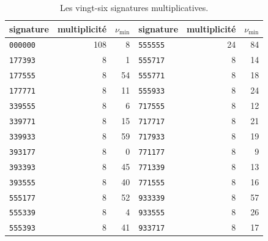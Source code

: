 \begin{minipage}{\linewidth}
\begin{table}[H]
\par\vspace{12pt}

\caption{Les vingt-six signatures multiplicatives.}
\label{act21:tpk:firmas-multiplicativas}
\begin{tabular}{@{}lrr@{\qquad}lrr@{}}
\toprule
signature&multiplicité&\(\nu_{\min}\)&signature&multiplicité&\(\nu_{\min}\)\\
\midrule
\texttt{000000}&108&8&\texttt{555555}&24&84\\
\texttt{177393}&8&1&\texttt{555717}&8&14\\
\texttt{177555}&8&54&\texttt{555771}&8&18\\
\texttt{177771}&8&11&\texttt{555933}&8&24\\
\texttt{339555}&8&6&\texttt{717555}&8&12\\
\texttt{339771}&8&15&\texttt{717717}&8&21\\
\texttt{339933}&8&59&\texttt{717933}&8&19\\
\texttt{393177}&8&0&\texttt{771177}&8&9\\
\texttt{393393}&8&45&\texttt{771339}&8&13\\
\texttt{393555}&8&40&\texttt{771555}&8&16\\
\texttt{555177}&8&52&\texttt{933339}&8&57\\
\texttt{555339}&8&4&\texttt{933555}&8&26\\
\texttt{555393}&8&41&\texttt{933717}&8&17\\
\bottomrule
\end{tabular}
\end{table}
\end{minipage}\par


